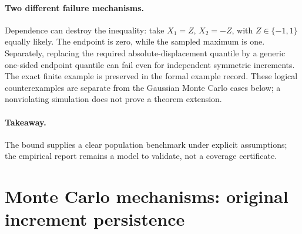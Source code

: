 \documentclass[11pt,a4paper]{article}
\begin{document}
\paragraph{Two different failure mechanisms.}
Dependence can destroy the inequality: take \(X_1=Z\), \(X_2=-Z\), with
\(Z\in\{-1,1\}\) equally likely. The endpoint is zero, while the sampled
maximum is one. Separately, replacing the required absolute-displacement
quantile by a generic one-sided endpoint quantile can fail even for independent
symmetric increments. The exact finite example is preserved in the formal
example record. These logical counterexamples are separate from the Gaussian
Monte Carlo cases below; a nonviolating simulation does not prove a theorem
extension.

\paragraph{Takeaway.}
The bound supplies a clear population benchmark under explicit assumptions;
the empirical report remains a model to validate, not a coverage certificate.\section{Monte Carlo mechanisms: original increment persistence}\label{sup:simulation-original}
\end{document}
